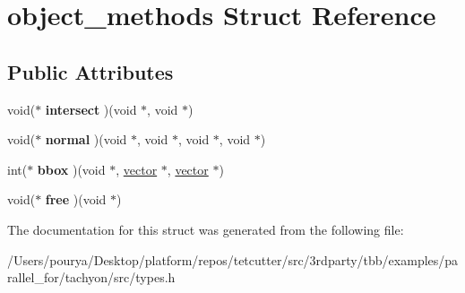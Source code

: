 \hypertarget{structobject__methods}{}\section{object\+\_\+methods Struct Reference}
\label{structobject__methods}
\subsection*{Public Attributes}
\begin{DoxyCompactItemize}
\item 
\hypertarget{structobject__methods_a8823f43cf545ca522d381c4e9a66ee1a}{}void($\ast$ {\bfseries intersect} )(void $\ast$, void $\ast$)\label{structobject__methods_a8823f43cf545ca522d381c4e9a66ee1a}

\item 
\hypertarget{structobject__methods_ac296c9fc6d745ae8964e085e7d754ca0}{}void($\ast$ {\bfseries normal} )(void $\ast$, void $\ast$, void $\ast$, void $\ast$)\label{structobject__methods_ac296c9fc6d745ae8964e085e7d754ca0}

\item 
\hypertarget{structobject__methods_a9df9feb4888e2ffc4f67e6e1281c0e38}{}int($\ast$ {\bfseries bbox} )(void $\ast$, \hyperlink{structvector}{vector} $\ast$, \hyperlink{structvector}{vector} $\ast$)\label{structobject__methods_a9df9feb4888e2ffc4f67e6e1281c0e38}

\item 
\hypertarget{structobject__methods_a0255c13ab9d7362d732853d936121206}{}void($\ast$ {\bfseries free} )(void $\ast$)\label{structobject__methods_a0255c13ab9d7362d732853d936121206}

\end{DoxyCompactItemize}


The documentation for this struct was generated from the following file\+:\begin{DoxyCompactItemize}
\item 
/\+Users/pourya/\+Desktop/platform/repos/tetcutter/src/3rdparty/tbb/examples/parallel\+\_\+for/tachyon/src/types.\+h\end{DoxyCompactItemize}
